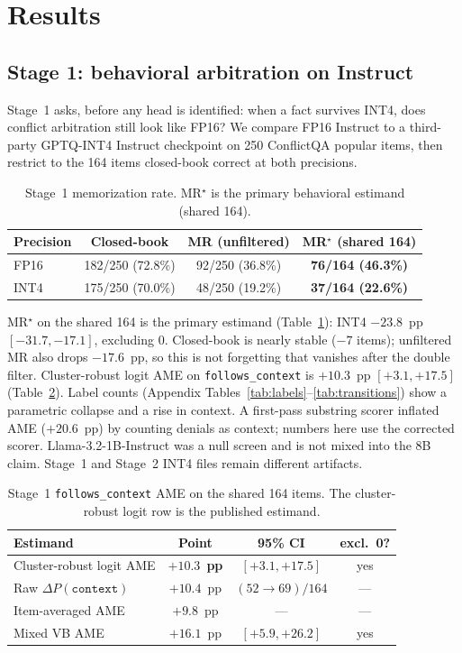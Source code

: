 \documentclass{article} %
\begin{document}
\section{Results}
\label{sec:results}

\subsection{Stage 1: behavioral arbitration on Instruct}
\label{sec:stage1}

Stage~1 asks, before any head is identified: when a fact survives INT4, does conflict arbitration still look like FP16? We compare FP16 Instruct to a third-party GPTQ-INT4 Instruct checkpoint on 250 ConflictQA popular items, then restrict to the 164 items closed-book correct at both precisions.

\begin{table}[t]
\caption{Stage~1 memorization rate. MR$^\star$ is the primary behavioral estimand (shared 164).}
\label{tab:mrstar}
\centering
\small
\begin{tabular}{lccc}
\toprule
Precision & Closed-book & MR (unfiltered) & MR$^\star$ (shared 164) \\
\midrule
FP16 & 182/250 (72.8\%) & 92/250 (36.8\%) & \textbf{76/164 (46.3\%)} \\
INT4 & 175/250 (70.0\%) & 48/250 (19.2\%) & \textbf{37/164 (22.6\%)} \\
\bottomrule
\end{tabular}
\end{table}

MR$^\star$ on the shared 164 is the primary estimand (Table~\ref{tab:mrstar}): INT4 $-23.8$~pp $[-31.7,-17.1]$, excluding 0. Closed-book is nearly stable ($-7$ items); unfiltered MR also drops $-17.6$~pp, so this is not forgetting that vanishes after the double filter. Cluster-robust logit AME on \texttt{follows\_context} is $+10.3$~pp $[+3.1,+17.5]$ (Table~\ref{tab:ame}). Label counts (Appendix Tables~\ref{tab:labels}--\ref{tab:transitions}) show a parametric collapse and a rise in context. A first-pass substring scorer inflated AME ($+20.6$~pp) by counting denials as context; numbers here use the corrected scorer. Llama-3.2-1B-Instruct was a null screen and is not mixed into the 8B claim. Stage~1 and Stage~2 INT4 files remain different artifacts.

\begin{table}[t]
\caption{Stage~1 \texttt{follows\_context} AME on the shared 164 items. The cluster-robust logit row is the published estimand.}
\label{tab:ame}
\centering
\small
\begin{tabular}{lccc}
\toprule
Estimand & Point & 95\% CI & excl.\ 0? \\
\midrule
Cluster-robust logit AME & $\mathbf{+10.3}$~\textbf{pp} & $\mathbf{[+3.1, +17.5]}$ & yes \\
Raw $\Delta P(\texttt{context})$ & $+10.4$~pp & $(52{\to}69)/164$ & --- \\
Item-averaged AME & $+9.8$~pp & --- & --- \\
Mixed VB AME & $+16.1$~pp & $[+5.9, +26.2]$ & yes \\
\bottomrule
\end{tabular}
\end{table}
\end{document}
